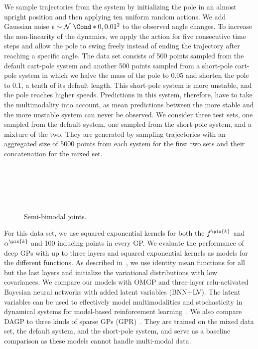 We sample trajectories from the system by initializing the pole in an almost upright position and then applying ten uniform random actions.
We add Gaussian noise $\epsilon \sim \Gaussian*{0, 0.01^2}$ to the observed angle changes.
To increase the non-linearity of the dynamics, we apply the action for five consecutive time steps and allow the pole to swing freely instead of ending the trajectory after reaching a specific angle.
The data set consists of 500 points sampled from the default cart-pole system and another 500 points sampled from a short-pole cart-pole system in which we halve the mass of the pole to 0.05 and shorten the pole to 0.1, a tenth of its default length.
This short-pole system is more unstable, and the pole reaches higher speeds.
Predictions in this system, therefore, have to take the multimodality into account, as mean predictions between the more stable and the more unstable system can never be observed.
We consider three test sets, one sampled from the default system, one sampled from the short-pole system, and a mixture of the two.
They are generated by sampling trajectories with an aggregated size of 5000 points from each system for the first two sets and their concatenation for the mixed set.
%
\begin{figure}[tp]
    \centering
    \\%
    \\%
    \\%
    \\%
    \caption[DAGP model symmetries]{
        \label{fig:data_association:semi_bimodal_multiple}
        Semi-bimodal joints.
    }
\end{figure}
%

For this data set, we use squared exponential kernels for both the $f^{\pix{k}}$ and $\alpha^{\pix{k}}$ and 100 inducing points in every GP.
We evaluate the performance of deep GPs with up to three layers and squared exponential kernels as models for the different functions.
As described in~\parencite{salimbeni_doubly_2017,kaiser_bayesian_2018}, we use identity mean functions for all but the last layers and initialize the variational distributions with low covariances.
We compare our models with OMGP and three-layer relu-activated Bayesian neural networks with added latent variables (BNN+LV).
The latent variables can be used to effectively model multimodalities and stochasticity in dynamical systems for model-based reinforcement learning~\parencite{depeweg_decomposition_2018}.
We also compare DAGP to three kinds of sparse GPs (GPR)~\parencite{hensman_scalable_2015}.
They are trained on the mixed data set, the default system, and the short-pole system, and serve as a baseline comparison as these models cannot handle multi-modal data.

